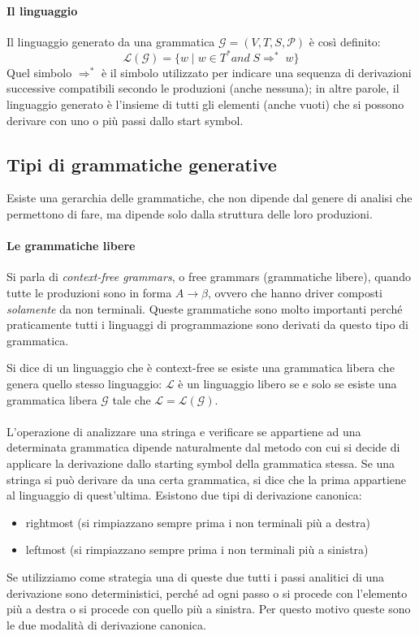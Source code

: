\documentclass[class=book, crop=false, oneside, 12pt]{standalone}
\begin{document}
\paragraph{Il linguaggio}
Il linguaggio generato da una grammatica \(\mathcal{G} = (V,T,S,\mathcal{P})\) è così definito:
\begin{equation}
    \mathcal{L}(\mathcal{G}) = \{w \mid w \in T^* and \; S \Rightarrow^*\;  w\}
\end{equation}
Quel simbolo \(\Rightarrow^*\) è il simbolo utilizzato per indicare una sequenza di derivazioni successive compatibili secondo le produzioni (anche nessuna); in altre parole, il linguaggio generato è l'insieme di tutti gli elementi (anche vuoti) che si possono derivare con uno o più passi dallo start symbol. 

\subsection{Tipi di grammatiche generative}
Esiste una gerarchia delle grammatiche, che non dipende dal genere di analisi che permettono di fare, ma dipende solo dalla struttura delle loro produzioni.

\paragraph{Le grammatiche libere}
Si parla di \emph{context-free grammars}, o free grammars (grammatiche libere), quando tutte le produzioni sono in forma \(A \to \beta\), ovvero che hanno driver composti \emph{solamente} da non terminali. Queste grammatiche sono molto importanti perché praticamente tutti i linguaggi di programmazione sono derivati da questo tipo di grammatica.

Si dice di un linguaggio che è context-free se esiste una grammatica libera che genera quello stesso linguaggio: \(\mathcal{L}\) è un linguaggio libero se e solo se esiste una grammatica libera \(\mathcal{G}\) tale che \(\mathcal{L}=\mathcal{L}(\mathcal{G})\).

\paragraph{}
L’operazione di analizzare una stringa e verificare se appartiene ad una determinata grammatica dipende naturalmente dal metodo con cui si decide di applicare la derivazione dallo starting symbol della grammatica stessa. Se una stringa si può derivare da una certa grammatica, si dice che la prima appartiene al linguaggio di quest'ultima.
Esistono due tipi di derivazione canonica:
\begin{itemize}
    \item rightmost (si rimpiazzano sempre prima i non terminali più a destra)
    \item leftmost (si rimpiazzano sempre prima i non terminali più a sinistra)
\end{itemize}
Se utilizziamo come strategia una di queste due tutti i passi analitici di una derivazione sono deterministici, perché ad ogni passo o si procede con l’elemento più a destra o si procede con quello più a sinistra. Per questo motivo queste sono le due modalità di derivazione canonica.
\end{document}
